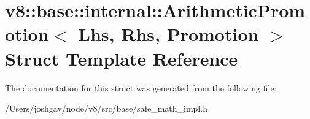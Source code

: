 \hypertarget{structv8_1_1base_1_1internal_1_1_arithmetic_promotion}{}\section{v8\+:\+:base\+:\+:internal\+:\+:Arithmetic\+Promotion$<$ Lhs, Rhs, Promotion $>$ Struct Template Reference}
\label{structv8_1_1base_1_1internal_1_1_arithmetic_promotion}


The documentation for this struct was generated from the following file\+:\begin{DoxyCompactItemize}
\item 
/\+Users/joshgav/node/v8/src/base/safe\+\_\+math\+\_\+impl.\+h\end{DoxyCompactItemize}
